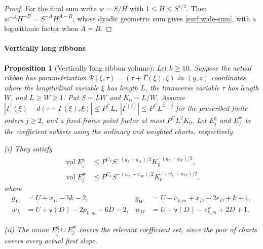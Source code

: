 \documentclass[11pt]{amsart}
\newtheorem{proposition}[theorem]{Proposition}
\theoremstyle{definition}
\theoremstyle{remark}
\numberwithin{equation}{section}
\begin{document}
\begin{proof}
For the final sum write $w=S/H$ with $1\le H\le S^{1/2}$. Then $w^{-A}H^{-B}=S^{-A}H^{A-B}$, whose dyadic geometric sum gives \eqref{surf:wide-sum}, with a logarithmic factor when $A=B$.
\end{proof}

\paragraph{Vertically long ribbons}

\begin{proposition}[Vertically long ribbon volume]\label{surf:vertical}
Let $k\ge10$. Suppose the actual ribbon has parametrization $\Psi(\xi,\tau)=(\tau+\Gamma(\xi),\xi)$ in $(y,z)$ coordinates, where the longitudinal variable $\xi$ has length $L$, the transverse variable $\tau$ has length $W$, and $L\ge W\ge1$. Put $S=LW$ and $K_0=L/W$. Assume $|\Gamma^\prime(\xi)-d(\tau+\Gamma(\xi),\xi)|\le P^CL$, $|\Gamma^{(j)}|\le P^CL^{3-j}$ for the prescribed finite orders $j\ge2$, and a fixed-frame point factor at most $P^CL^2K_0$. Let $E_j^{\mathrm g}$ and $E_j^{\mathrm w}$ be the coefficient subsets using the ordinary and weighted charts, respectively.

\noindent\textup{(i)} They satisfy
\begin{equation}\label{surf:vertical-eq}
\begin{aligned}
\operatorname{vol}E_j^{\mathrm g}&\le P^{C_k}S^{-(g_L+g_W)/2}K_0^{-(g_L-g_W)/2},\\
\operatorname{vol}E_j^{\mathrm w}&\le P^{C_k}S^{-(w_L+w_W)/2}K_0^{-(w_L-w_W)/2}.
\end{aligned}
\end{equation}
where
\begin{align*}
g_L&=U+x_D-5k-2,&g_W&=U-c_{k,m}+x_D-2e_D+k+1,\\
w_L&=U+\mathsf{v}(D)-2p_{k,m}-6D-2,&w_W&=U-\mathsf{v}(D)-c_{k,m}^{\mathrm w}+2D+1.
\end{align*}

\noindent\textup{(ii)} The union $E_j^{\mathrm g}\cup E_j^{\mathrm w}$ covers the relevant coefficient set, since the pair of charts covers every actual first slope.
\end{proposition}
\end{document}
